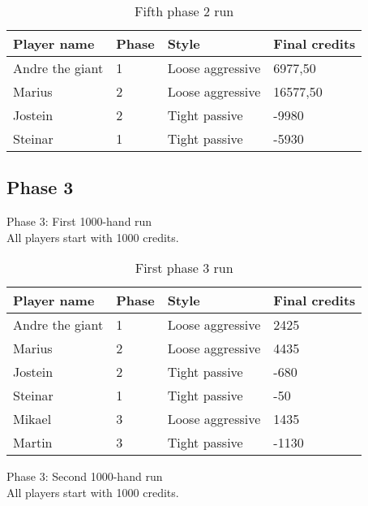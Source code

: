 \documentclass[a4paper, 12pt]{article}
\begin{document}
\begin{table}[H]
	\begin{center}
		\begin{tabular}{|l|l|l| p{6cm} |}
		\hline
		\textbf{Player name} & \textbf{Phase} & \textbf{Style} & \textbf{Final credits} \\
		\hline
		Andre the giant & 1 & Loose aggressive & 6977,50 \\
		\hline
		Marius & 2 & Loose aggressive & 16577,50 \\
		\hline
		Jostein & 2 & Tight passive & -9980 \\
		\hline
		Steinar & 1 & Tight passive & -5930 \\
		\hline
		\end{tabular}
	\end{center}
	\caption{Fifth phase 2 run}
\end{table}

\subsection{Phase 3}
\begin{center}
	{ \Large Phase 3: First 1000-hand run } \\
	All players start with 1000 credits.
\end{center}

\begin{table}[H]
	\begin{center}
		\begin{tabular}{|l|l|l| p{6cm} |}
		\hline
		\textbf{Player name} & \textbf{Phase} & \textbf{Style} & \textbf{Final credits} \\
		\hline
		Andre the giant & 1 & Loose aggressive & 2425 \\
		\hline
		Marius & 2 & Loose aggressive & 4435 \\
		\hline
		Jostein & 2 & Tight passive & -680 \\
		\hline
		Steinar & 1 & Tight passive & -50 \\
		\hline
		Mikael & 3 & Loose aggressive & 1435 \\
		\hline
		Martin & 3 & Tight passive & -1130 \\
		\hline
		\end{tabular}
	\end{center}
	\caption{First phase 3 run}
\end{table}

\begin{center}
	{ \Large Phase 3: Second 1000-hand run } \\
	All players start with 1000 credits.
\end{center}
\end{document}
